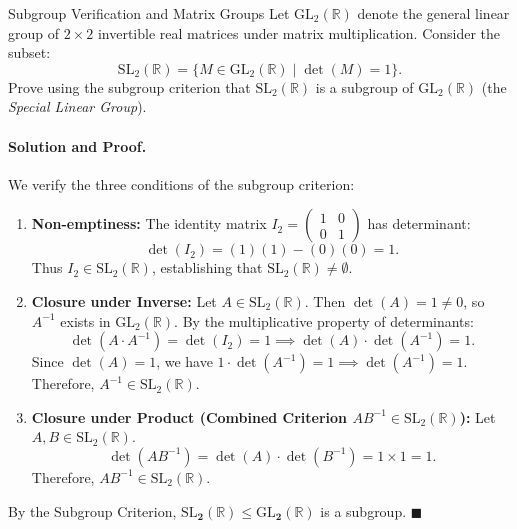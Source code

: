 \begin{workedexample}{Subgroup Verification and Matrix Groups}
Let $\mathrm{GL}_2(\mathbb{R})$ denote the general linear group of $2 \times 2$ invertible real matrices under matrix multiplication. Consider the subset:
\[
\mathrm{SL}_2(\mathbb{R}) = \{ M \in \mathrm{GL}_2(\mathbb{R}) \mid \det(M) = 1 \}.
\]
Prove using the subgroup criterion that $\mathrm{SL}_2(\mathbb{R})$ is a subgroup of $\mathrm{GL}_2(\mathbb{R})$ (the \textit{Special Linear Group}).

\paragraph{Solution and Proof.}
We verify the three conditions of the subgroup criterion:
\begin{enumerate}[leftmargin=1.4em,itemsep=3pt]
  \item \textbf{Non-emptiness:}
  The identity matrix $I_2 = \begin{pmatrix} 1 & 0 \\ 0 & 1 \end{pmatrix}$ has determinant:
  \[
  \det(I_2) = (1)(1) - (0)(0) = 1.
  \]
  Thus $I_2 \in \mathrm{SL}_2(\mathbb{R})$, establishing that $\mathrm{SL}_2(\mathbb{R}) \neq \emptyset$.
  \item \textbf{Closure under Inverse:}
  Let $A \in \mathrm{SL}_2(\mathbb{R})$. Then $\det(A) = 1 \neq 0$, so $A^{-1}$ exists in $\mathrm{GL}_2(\mathbb{R})$.
  By the multiplicative property of determinants:
  \[
  \det(A \cdot A^{-1}) = \det(I_2) = 1 \implies \det(A) \cdot \det(A^{-1}) = 1.
  \]
  Since $\det(A) = 1$, we have $1 \cdot \det(A^{-1}) = 1 \implies \det(A^{-1}) = 1$.
  Therefore, $A^{-1} \in \mathrm{SL}_2(\mathbb{R})$.
  \item \textbf{Closure under Product (Combined Criterion $A B^{-1} \in \mathrm{SL}_2(\mathbb{R})$):}
  Let $A, B \in \mathrm{SL}_2(\mathbb{R})$.
  \[
  \det(A B^{-1}) = \det(A) \cdot \det(B^{-1}) = 1 \times 1 = 1.
  \]
  Therefore, $A B^{-1} \in \mathrm{SL}_2(\mathbb{R})$.
\end{enumerate}
By the Subgroup Criterion, $\mathbf{\mathrm{SL}_2(\mathbb{R}) \le \mathrm{GL}_2(\mathbb{R})}$ is a subgroup. $\blacksquare$
\end{workedexample}

